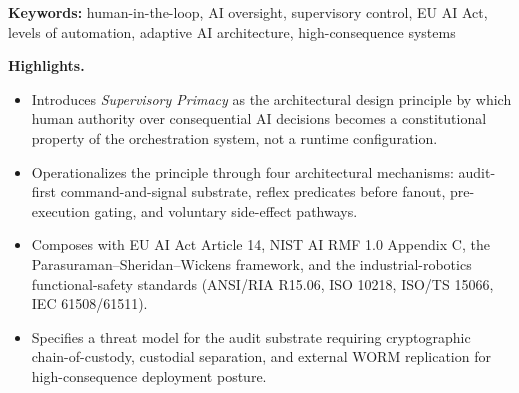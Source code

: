 \begin{abstract}
\noindent Human-in-the-loop (HITL) frameworks for AI systems are increasingly
treated as policy-level commitments --- ``the human can always
override'' --- when their operational effectiveness requires that they
be architectural properties of the system itself. A policy-level HITL
commitment is disabled by a configuration flag; an architectural HITL
property is disabled by rebuilding from source. This paper introduces
\emph{Supervisory Primacy} as a design principle: the
human-authoritative state is the architectural default for consequential
actions in adaptive AI orchestration systems, with the AI proposing and
the human disposing, every consequential action carrying a mandatory
authorization audit trail, and the eight non-negotiable operational
integrity constraints implemented as enforceable safeguards in
deployment builds rather than as runtime policy. Supervisory Primacy is
consistent with the human oversight requirements of EU AI Act Article 14
\cite{ref1}, operates within the levels-of-automation taxonomy of
Parasuraman, Sheridan, and Wickens \cite{ref2}, and is illustrated using
MILO, a patent-pending adaptive AI orchestrator \cite{ref3} submitted to the
U.S. Department of Energy under the Genesis Mission \cite{ref4}. The
contribution is at the architectural level: Supervisory Primacy is not a
new HITL taxonomy; it is the structural design that makes HITL
load-bearing rather than retrofittable.
\end{abstract}

\noindent\textbf{Keywords:} human-in-the-loop, AI oversight, supervisory control,
EU AI Act, levels of automation, adaptive AI architecture,
high-consequence systems\par

\textbf{Highlights.}

\begin{itemize}
\tightlist
\item
  Introduces \emph{Supervisory Primacy} as the architectural design
  principle by which human authority over consequential AI decisions
  becomes a constitutional property of the orchestration system, not a
  runtime configuration.
\item
  Operationalizes the principle through four architectural mechanisms:
  audit-first command-and-signal substrate, reflex predicates before
  fanout, pre-execution gating, and voluntary side-effect pathways.
\item
  Composes with EU AI Act Article 14, NIST AI RMF 1.0 Appendix C, the
  Parasuraman--Sheridan--Wickens framework, and the industrial-robotics
  functional-safety standards (ANSI/RIA R15.06, ISO 10218, ISO/TS 15066,
  IEC 61508/61511).
\item
  Specifies a threat model for the audit substrate requiring
  cryptographic chain-of-custody, custodial separation, and external
  WORM replication for high-consequence deployment posture.
\end{itemize}

